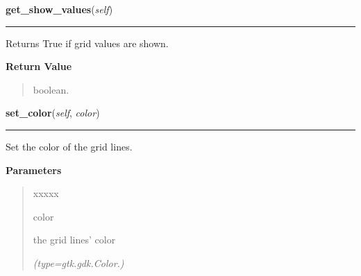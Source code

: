     \label{pygtk_chart:bar_chart:Grid:get_show_values}

    \vspace{0.5ex}

\hspace{.8\funcindent}\begin{boxedminipage}{\funcwidth}

    \raggedright \textbf{get\_show\_values}(\textit{self})

    \vspace{-1.5ex}

    \rule{\textwidth}{0.5\fboxrule}
\setlength{\parskip}{2ex}
    Returns True if grid values are shown.

\setlength{\parskip}{1ex}
      \textbf{Return Value}
    \vspace{-1ex}

      \begin{quote}
      boolean.

      \end{quote}

    \end{boxedminipage}

    \label{pygtk_chart:bar_chart:Grid:set_color}

    \vspace{0.5ex}

\hspace{.8\funcindent}\begin{boxedminipage}{\funcwidth}

    \raggedright \textbf{set\_color}(\textit{self}, \textit{color})

    \vspace{-1.5ex}

    \rule{\textwidth}{0.5\fboxrule}
\setlength{\parskip}{2ex}
    Set the color of the grid lines.

\setlength{\parskip}{1ex}
      \textbf{Parameters}
      \vspace{-1ex}

      \begin{quote}
        \begin{Ventry}{xxxxx}

          \item[color]

          the grid lines' color

            {\it (type=gtk.gdk.Color.)}

        \end{Ventry}

      \end{quote}

    \end{boxedminipage}

